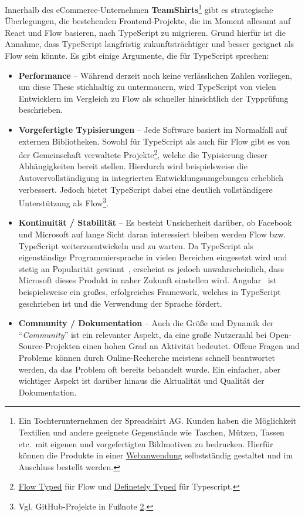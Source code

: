 Innerhalb des eCommerce-Unternehmen \textbf{TeamShirts}\footnote{Ein Tochterunternehmen der Spreadshirt AG. Kunden haben die Möglichkeit Textilien und andere geeignete Gegenstände wie Taschen, Mützen, Tassen etc.~mit eigenen und vorgefertigten Bildmotiven zu bedrucken. Hierfür können die Produkte in einer \href{https://wizard.teamshirts.de/de/DE/generic}{Webanwendung} selbstständig gestaltet und im Anschluss bestellt werden.} gibt es strategische Überlegungen, die bestehenden Frontend-Projekte, die im Moment allesamt auf React und Flow basieren, nach TypeScript zu migrieren. Grund hierfür ist die Annahme, dass TypeScript langfristig zukunftsträchtiger und besser geeignet als Flow sein könnte. Es gibt einige Argumente, die für TypeScript sprechen:

\begin{itemize}
    \item
        \textbf{Performance} -- Während derzeit noch keine verlässlichen Zahlen vorliegen, um diese These stichhaltig zu untermauern, wird TypeScript von vielen Entwicklern im Vergleich zu Flow als schneller hinsichtlich der Typprüfung beschrieben.
    \item
        \textbf{Vorgefertigte Typisierungen} -- Jede Software basiert im Normalfall auf externen Bibliotheken. Sowohl für TypeScript als auch für Flow gibt es von der Gemeinschaft verwaltete Projekte\footnote{\href{https://github.com/flow-typed/flow-typed}{Flow Typed} für Flow und \href{https://github.com/DefinitelyTyped/DefinitelyTyped}{Definetely Typed} für Typescript.\label{github-projects}}, welche die Typisierung dieser Abhängigkeiten bereit stellen. Hierdurch wird beispielsweise die Autovervollständigung in integrierten Entwicklungsumgebungen erheblich verbessert. Jedoch bietet TypeScript dabei eine deutlich vollständigere Unterstützung als Flow\footnote{Vgl. GitHub-Projekte in Fußnote \ref{github-projects}.}.
    \item
        \textbf{Kontinuität / Stabilität} -- Es besteht Unsicherheit darüber, ob Facebook und Microsoft auf lange Sicht daran interessiert bleiben werden Flow bzw. TypeScript weiterzuentwickeln und zu warten. Da TypeScript als eigenständige Programmiersprache in vielen Bereichen eingesetzt wird und stetig an Popularität gewinnt~\autocite{stackoverflow:survey:2018}, erscheint es jedoch unwahrscheinlich, dass Microsoft dieses Produkt in naher Zukunft einstellen wird. Angular~\autocite{angular} ist beispielsweise ein großes, erfolgreiches Framework, welches in TypeScript geschrieben ist und die Verwendung der Sprache fördert.
    \item
        \textbf{Community / Dokumentation} -- Auch die Größe und Dynamik der \enquote{\emph{Community}} ist ein relevanter Aspekt, da eine große Nutzerzahl bei Open-Source-Projekten einen hohen Grad an Aktivität bedeutet. Offene Fragen und Probleme können durch Online-Recherche meistens schnell beantwortet werden, da das Problem oft bereits behandelt wurde. Ein einfacher, aber wichtiger Aspekt ist darüber hinaus die Aktualität und Qualität der Dokumentation.
\end{itemize}

